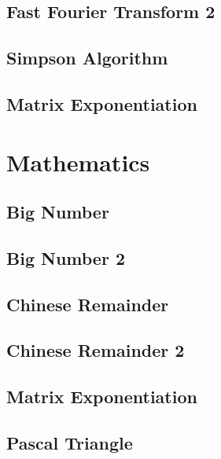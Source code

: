 \subsection{Fast Fourier Transform 2}
\raggedbottom
\hrulefill
\subsection{Simpson Algorithm}
\raggedbottom
\hrulefill
\subsection{Matrix Exponentiation}
\raggedbottom
\hrulefill

\section{Mathematics}
\subsection{Big Number}
\raggedbottom
\hrulefill
\subsection{Big Number 2}
\raggedbottom
\hrulefill
\subsection{Chinese Remainder}
\raggedbottom
\hrulefill
\subsection{Chinese Remainder 2}
\raggedbottom
\hrulefill
\subsection{Matrix Exponentiation}
\raggedbottom
\hrulefill
\subsection{Pascal Triangle}
\raggedbottom
\hrulefill
